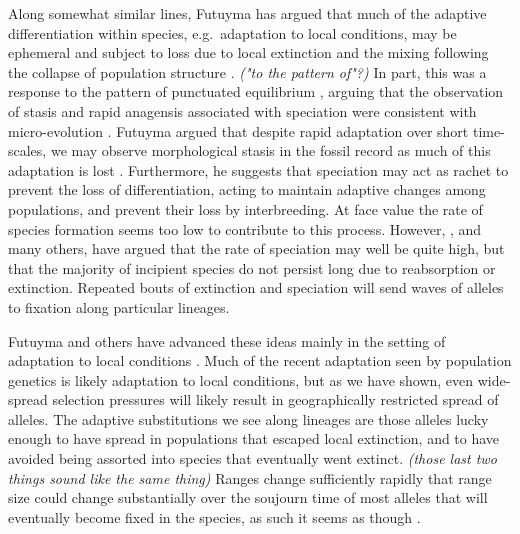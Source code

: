 \documentclass{article}
\newcommand{\plr}[1]{{\it\color{blue}(#1)}}
\begin{document}
Along somewhat similar lines, Futuyma has argued that much of the adaptive differentiation within species,
e.g.\ adaptation to local conditions, 
may be ephemeral and subject to loss due to local extinction and the mixing 
following the collapse of population structure \citep{Futuyma:10,FUTUYMA:87}. 
\plr{"to the pattern of"?}
In part, this was a response to the pattern of punctuated equilibrium \citep{eldredgegould72}, 
arguing that the observation of stasis and rapid anagensis associated with speciation 
were consistent with micro-evolution \citep[see also ][]{Futuyma:1989editedbook}. 
Futuyma argued that despite rapid adaptation over short time-scales, we
may observe morphological stasis in the fossil record as much of this adaptation is lost 
\citep[see also][]{lieberman:96,Eldredge:05}. 
Furthermore, he suggests that speciation
may act as rachet to prevent the loss of differentiation, acting to
maintain adaptive changes among populations, and prevent their loss by interbreeding. 
At face value the rate of species formation seems too low to contribute to this process. 
However, \citep{Rosenblum:12}, and many others, 
have argued that the rate of speciation may well be quite high,
but that the majority of incipient species do not persist long due to reabsorption or extinction. 
Repeated bouts of extinction and speciation will send waves of alleles
to fixation along particular lineages. 

Futuyma and others have advanced these ideas mainly in the
setting of adaptation to local conditions 
\citep[particularly local communities ][]{} . 
Much of the recent adaptation seen by
population genetics is likely adaptation to local conditions, 
but as we have shown, even wide-spread selection pressures will likely result in 
geographically restricted spread of alleles.
The adaptive substitutions we see along lineages are those alleles 
lucky enough to have spread in populations that escaped local extinction, 
and to have avoided being assorted into species that eventually went extinct. 
\plr{those last two things sound like the same thing}
Ranges change sufficiently rapidly that
range size could change substantially over the soujourn time of most alleles 
that will eventually become fixed in the species, as such it seems as though . 
\end{document}
